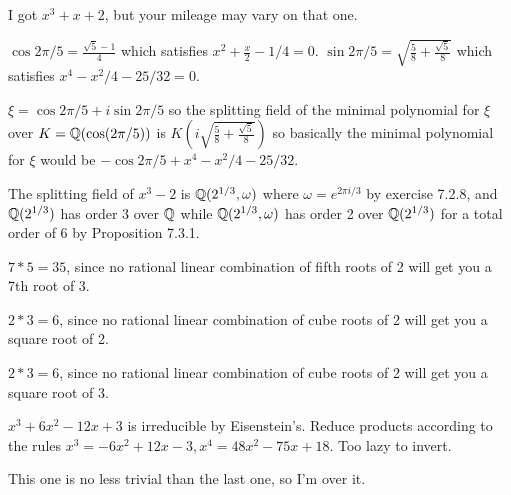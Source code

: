 \documentclass[11pt, oneside]{article}   	%
\begin{document}
\item I got $x^3 + x + 2$, but your mileage may vary on that one.
\ee
\item \be
\item $\cos{2\pi/5} = \frac{\sqrt{5}-1}{4}$ which satisfies $x^2 + \frac{x}{2} - 1/4 = 0$. $\sin{2\pi/5} = \sqrt{\frac{5}{8} + \frac{\sqrt{5}}{8}}$ which satisfies $x^4 - x^2/4 - 25/32 = 0$.
\item $\xi = \cos{2\pi/5} + i\sin{2\pi/5}$ so the splitting field of the minimal polynomial for $\xi$ over $K = \mathbb{Q}(\cos(2\pi/5))$ is $K(i\sqrt{\frac{5}{8} + \frac{\sqrt{5}}{8}})$ so basically the minimal polynomial for $\xi$ would be $-\cos{2\pi/5} + x^4 - x^2/4 - 25/32$.
\ee
\item The splitting field of $x^3 - 2$ is $\mathbb{Q}(2^{1/3}, \omega)$ where $\omega = e^{2\pi i/3}$ by exercise 7.2.8, and $\mathbb{Q}(2^{1/3})$ has order 3 over $\mathbb{Q}$ while $\mathbb{Q}(2^{1/3}, \omega)$ has order 2 over $\mathbb{Q}(2^{1/3})$ for a total order of 6 by Proposition 7.3.1.
\item $7*5=35$, since no rational linear combination of fifth roots of 2 will get you a 7th root of 3.
\item \be
\item $2*3=6$, since no rational linear combination of cube roots of 2 will get you a square root of 2.
\item $2*3=6$, since no rational linear combination of cube roots of 2 will get you a square root of 3.
\ee
\item $x^3 + 6x^2 - 12x + 3$ is irreducible by Eisenstein's. Reduce products according to the rules $x^3 = -6x^2 + 12x -3, x^4 = 48x^2 - 75x + 18$. Too lazy to invert.
\item This one is no less trivial than the last one, so I'm over it.
\ee
\end{document}
